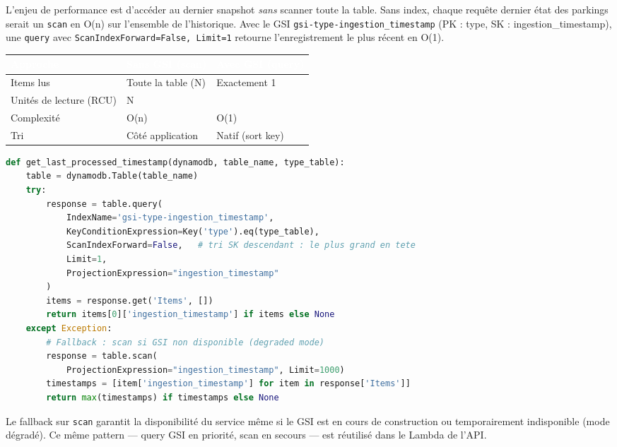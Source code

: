 \documentclass[11pt]{article}
\newcommand{\thead}[1]{\textbf{\textcolor{white}{#1}}}
\begin{document}
L'enjeu de performance est d'accéder au dernier snapshot \textit{sans} scanner toute
la table. Sans index, chaque requête \og{}dernier état des parkings\fg{} serait un
\texttt{scan} en O(n) sur l'ensemble de l'historique. Avec le GSI
\texttt{gsi-type-ingestion\_timestamp} (PK : type, SK : ingestion\_timestamp), une
\texttt{query} avec \texttt{ScanIndexForward=False, Limit=1} retourne
l'enregistrement le plus récent en O(1).

\begin{center}\begin{tabularx}{\linewidth}{|l|>{\raggedright\arraybackslash}X|>{\raggedright\arraybackslash}X|}
\hline
\rowcolor{tableHeader}
\thead{Approche} & \thead{Sans GSI (scan)} & \thead{Avec GSI (query)} \\
\hline
Items lus & Toute la table (N) & Exactement 1 \\
\hline
Unités de lecture (RCU) & N & 1 \\
\hline
Complexité & O(n) & O(1) \\
\hline
Tri & Côté application & Natif (sort key) \\
\hline
\end{tabularx}\end{center}

\begin{lstlisting}[language=Python, caption=Requête GSI -- dernier timestamp O(1) avec fallback scan (utils\_dynamodb.py)]
def get_last_processed_timestamp(dynamodb, table_name, type_table):
    table = dynamodb.Table(table_name)
    try:
        response = table.query(
            IndexName='gsi-type-ingestion_timestamp',
            KeyConditionExpression=Key('type').eq(type_table),
            ScanIndexForward=False,   # tri SK descendant : le plus grand en tete
            Limit=1,
            ProjectionExpression="ingestion_timestamp"
        )
        items = response.get('Items', [])
        return items[0]['ingestion_timestamp'] if items else None
    except Exception:
        # Fallback : scan si GSI non disponible (degraded mode)
        response = table.scan(
            ProjectionExpression="ingestion_timestamp", Limit=1000)
        timestamps = [item['ingestion_timestamp'] for item in response['Items']]
        return max(timestamps) if timestamps else None
\end{lstlisting}

Le fallback sur \texttt{scan} garantit la disponibilité du service même si le GSI est
en cours de construction ou temporairement indisponible (mode dégradé). Ce même
pattern --- query GSI en priorité, scan en secours --- est réutilisé dans le Lambda
de l'API.
\end{document}
